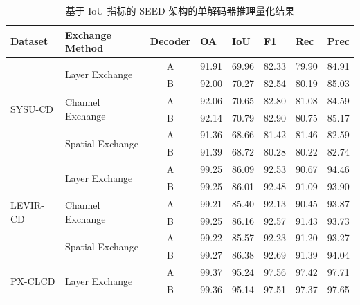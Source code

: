 \begin{table}[!htb]
    \centering
    \scriptsize %
    \caption{基于 IoU 指标的 SEED 架构的单解码器推理量化结果}
    \label{tab:inference_single_decoder}
    \begin{tabularx}{\textwidth}{l X c X X X X X}
        \hline
        \textbf{Dataset} & \textbf{Exchange Method} & \textbf{Decoder} & \textbf{OA} & \textbf{IoU} & \textbf{F1} & \textbf{Rec} & \textbf{Prec} \\
        \hline
        \multirow{6}{*}{SYSU-CD}
            & \multirow{2}{*}{Layer Exchange}   & A & 91.91 & 69.96 & 82.33 & 79.90 & 84.91 \\
            &                                   & B & 92.00 & 70.27 & 82.54 & 80.19 & 85.03 \\
            \cline{2-8}
            & \multirow{2}{*}{Channel Exchange} & A & 92.06 & 70.65 & 82.80 & 81.08 & 84.59 \\
            &                                   & B & 92.14 & 70.79 & 82.90 & 80.75 & 85.17 \\
            \cline{2-8}
            & \multirow{2}{*}{Spatial Exchange} & A & 91.36 & 68.66 & 81.42 & 81.46 & 82.59 \\
            &                                   & B & 91.39 & 68.72 & 80.28 & 80.22 & 82.74 \\
        \hline
        \multirow{6}{*}{LEVIR-CD}
            & \multirow{2}{*}{Layer Exchange}   & A & 99.25 & 86.09 & 92.53 & 90.67 & 94.46 \\
            &                                   & B & 99.25 & 86.01 & 92.48 & 91.09 & 93.90 \\
            \cline{2-8}
            & \multirow{2}{*}{Channel Exchange} & A & 99.21 & 85.40 & 92.13 & 90.45 & 93.87 \\
            &                                   & B & 99.25 & 86.16 & 92.57 & 91.43 & 93.73 \\
            \cline{2-8}
            & \multirow{2}{*}{Spatial Exchange} & A & 99.22 & 85.57 & 92.23 & 91.20 & 93.27 \\
            &                                   & B & 99.27 & 86.38 & 92.69 & 91.39 & 94.04 \\
        \hline
        \multirow{6}{*}{PX-CLCD}
            & \multirow{2}{*}{Layer Exchange}   & A & 99.37 & 95.24 & 97.56 & 97.42 & 97.71 \\
            &                                   & B & 99.36 & 95.14 & 97.51 & 97.37 & 97.65 \\

\end{tabularx}
\end{table}
